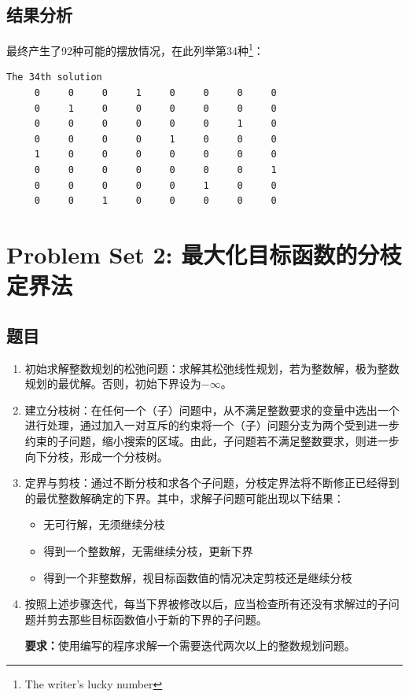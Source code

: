 \documentclass[a4paper, 12pt]{ctexart}  %
\begin{document}
\subsection{结果分析}
最终产生了92种可能的摆放情况，在此列举第34种\footnote{The writer's lucky number}：

\begin{verbatim}
The 34th solution
     0     0     0     1     0     0     0     0
     0     1     0     0     0     0     0     0
     0     0     0     0     0     0     1     0
     0     0     0     0     1     0     0     0
     1     0     0     0     0     0     0     0
     0     0     0     0     0     0     0     1
     0     0     0     0     0     1     0     0
     0     0     1     0     0     0     0     0
\end{verbatim}

\section{Problem Set 2: 最大化目标函数的分枝定界法}
\subsection{题目}
\begin{enumerate}
\item 初始求解整数规划的松弛问题：求解其松弛线性规划，若为整数解，极为整数规划的最优解。否则，初始下界设为$-\infty$。
\item 建立分枝树：在任何一个（子）问题中，从不满足整数要求的变量中选出一个进行处理，通过加入一对互斥的约束将一个（子）问题分支为两个受到进一步约束的子问题，缩小搜索的区域。由此，子问题若不满足整数要求，则进一步向下分枝，形成一个分枝树。
\item 定界与剪枝：通过不断分枝和求各个子问题，分枝定界法将不断修正已经得到的最优整数解确定的下界。其中，求解子问题可能出现以下结果：
	\begin{itemize}
	\item 无可行解，无须继续分枝
	\item 得到一个整数解，无需继续分枝，更新下界
	\item 得到一个非整数解，视目标函数值的情况决定剪枝还是继续分枝
	\end{itemize}
\item 按照上述步骤迭代，每当下界被修改以后，应当检查所有还没有求解过的子问题并剪去那些目标函数值小于新的下界的子问题。

\textbf{要求：}使用编写的程序求解一个需要迭代两次以上的整数规划问题。
\end{enumerate}
\end{document}
